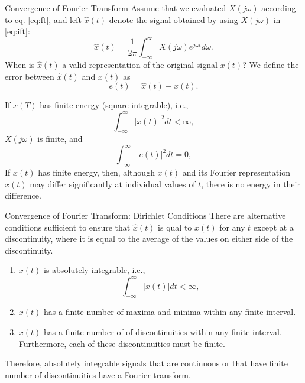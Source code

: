 \begin{frame}[plain]{Convergence of Fourier Transform}
    Assume that we evaluated $X(j\omega)$ according to eq. \ref{eq:ft}, and left $\hat{x}(t)$ denote the signal obtained by using $X(j\omega)$ in \ref{eq:ift}:
    \begin{equation*}
        \hat{x}(t) = \frac{1}{2\pi}\int_{-\infty}^{\infty}X(j\omega)e^{j\omega t} d\omega.
    \end{equation*}
    When is $\hat{x}(t)$  a valid representation of the original signal $x(t)$? We define the error between $\hat{x}(t)$ and $x(t)$ as
    \begin{equation*}
        e(t) = \hat{x}(t) - x(t).
    \end{equation*}

    If $x(T)$ has finite energy (square integrable), i.e.,
    \begin{equation}
        \int_{-\infty}^{\infty}|x(t)|^2dt < \infty,
    \end{equation}
    $X(j\omega)$ is finite, and
    \begin{equation}
        \int_{-\infty}^{\infty}|e(t)|^2dt = 0,
    \end{equation}
    If $x(t)$ has finite energy, then, although $x(t)$ and its Fourier representation  $\hat{x}(t)$ may differ significantly at individual values of $t$, there is no  energy in their difference.
\end{frame}

\begin{frame}[plain]{Convergence of Fourier Transform: Dirichlet Conditions}
    There are alternative conditions sufficient to ensure that  $\hat{x}(t)$ is qual to $x(t)$ for any $t$ except at a discontinuity, where it is equal to the average of the values on either side of the discontinuity.
    \begin{enumerate}
        \item $x(t)$ is absolutely integrable, i.e.,
            \begin{equation}
                \int_{-\infty}^{\infty}|x(t)|dt < \infty,
            \end{equation}
        \item $x(t)$ has a finite number of maxima and minima within any finite interval.
        \item $x(t)$ has a finite number of of discontinuities within any finite interval. Furthermore, each of these discontinuities must be finite.
    \end{enumerate}
    Therefore, absolutely integrable signals that are continuous or that have finite number of discontinuities have a Fourier transform.
\end{frame}

